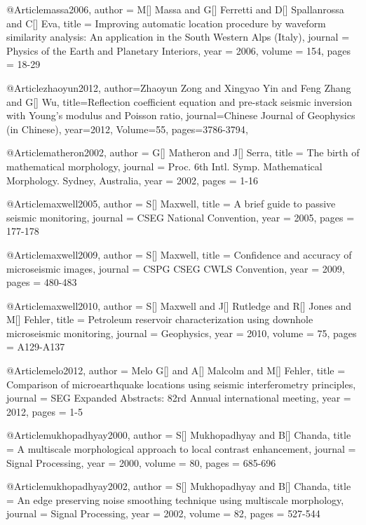      @Article{massa2006,
  author = 	 {M[] Massa and G[] Ferretti and D[] Spallanrossa and C[] Eva},
  title = 	 {Improving automatic location procedure by waveform similarity analysis: An application in the South Western Alps (Italy)},
  journal = 	 {Physics of the Earth and Planetary Interiors},
  year = 	 2006,
  volume = 	 154,
  pages = 	 {18-29}}  



@Article{zhaoyun2012,
  author={Zhaoyun Zong and Xingyao Yin and Feng Zhang and G[] Wu},
  title={Reflection coefficient equation and pre-stack seismic inversion with Young's modulus and Poisson ratio},
  journal={Chinese Journal of Geophysics (in Chinese)},
  year=2012,
  Volume=55,
  pages={3786-3794},
}


  
  
      @Article{matheron2002,
  author = 	 {G[] Matheron and J[] Serra},
  title = 	 {The birth of mathematical morphology},
  journal = 	 {Proc. 6th Intl. Symp.
Mathematical Morphology. Sydney, Australia},
  year = 	 2002,
  pages = 	 {1-16}}   

     @Article{maxwell2005,
  author = 	 {S[] Maxwell},
  title = 	 {A brief guide to passive seismic monitoring},
  journal = 	 {CSEG National Convention},
  year = 	 2005,
  pages = 	 {177-178}}   
  
     @Article{maxwell2009,
  author = 	 {S[] Maxwell},
  title = 	 {Confidence and accuracy of microseismic images},
  journal = 	 {CSPG CSEG CWLS Convention},
  year = 	 2009,
  pages = 	 {480-483}}   
  
    
     @Article{maxwell2010,
  author = 	 {S[] Maxwell and J[] Rutledge and R[] Jones and M[] Fehler},
  title = 	 {Petroleum reservoir characterization using downhole microseismic monitoring},
  journal = 	 {Geophysics},
  year = 	 2010,
  volume = 	 75,
  pages = 	 {A129-A137}}  


     @Article{melo2012,
  author = 	 {Melo G[] and A[] Malcolm and M[] Fehler},
  title = 	 {Comparison of microearthquake locations using seismic interferometry principles},
  journal = 	 {SEG Expanded Abstracts: 82rd Annual international meeting},
  year = 	 2012,
  pages = 	 {1-5}}  
  
      @Article{mukhopadhyay2000,
  author = 	 {S[] Mukhopadhyay and B[] Chanda},
  title = 	 {A multiscale morphological approach to local contrast enhancement},
  journal = 	 {Signal Processing},
  year = 	 2000,
  volume = 	 80,
  pages = 	 {685-696}} 


      @Article{mukhopadhyay2002,
  author = 	 {S[] Mukhopadhyay and B[] Chanda},
  title = 	 {An edge preserving noise smoothing technique using
multiscale morphology},
  journal = 	 {Signal Processing},
  year = 	 2002,
  volume = 	 82,
  pages = 	 {527-544}} 
  

